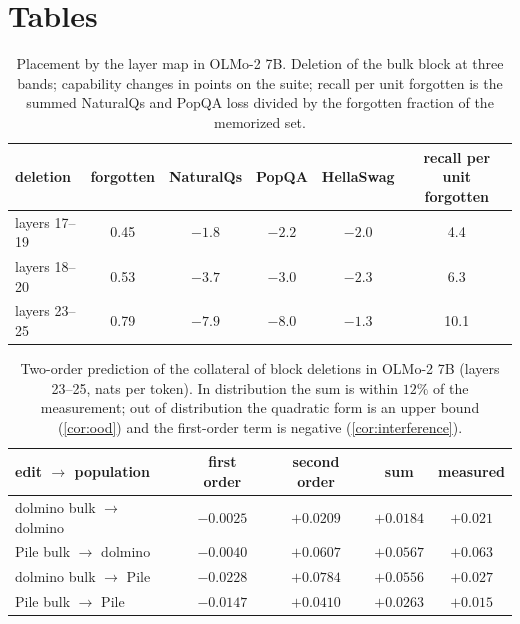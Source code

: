 \documentclass{article}
\theoremstyle{definition}\newtheorem{law}{Empirical law}
\begin{document}



\appendix


\section{Tables}\label{app:tables}
\begin{table}[t]
\centering\small
\caption{Placement by the layer map in OLMo-2 7B. Deletion of the bulk block at three bands; capability changes in points on the suite; recall per unit forgotten is the summed NaturalQs and PopQA loss divided by the forgotten fraction of the memorized set.}\label{tab:placement}
\begin{tabular}{lccccc}\toprule
deletion & forgotten & NaturalQs & PopQA & HellaSwag & recall per unit forgotten\\\midrule
layers 17--19 & 0.45 & $-1.8$ & $-2.2$ & $-2.0$ & 4.4\\
layers 18--20 & 0.53 & $-3.7$ & $-3.0$ & $-2.3$ & 6.3\\
layers 23--25 & 0.79 & $-7.9$ & $-8.0$ & $-1.3$ & 10.1\\\bottomrule
\end{tabular}
\end{table}
\begin{table}[t]
\centering\small
\caption{Two-order prediction of the collateral of block deletions in OLMo-2 7B (layers 23--25, nats per token). In distribution the sum is within $12\%$ of the measurement; out of distribution the quadratic form is an upper bound (\cref{cor:ood}) and the first-order term is negative (\cref{cor:interference}).}\label{tab:collateral}
\begin{tabular}{lcccc}\toprule
edit $\to$ population & first order & second order & sum & measured\\\midrule
dolmino bulk $\to$ dolmino & $-0.0025$ & $+0.0209$ & $+0.0184$ & $+0.021$\\
Pile bulk $\to$ dolmino & $-0.0040$ & $+0.0607$ & $+0.0567$ & $+0.063$\\
dolmino bulk $\to$ Pile & $-0.0228$ & $+0.0784$ & $+0.0556$ & $+0.027$\\
Pile bulk $\to$ Pile & $-0.0147$ & $+0.0410$ & $+0.0263$ & $+0.015$\\\bottomrule
\end{tabular}
\end{table}
\end{document}
